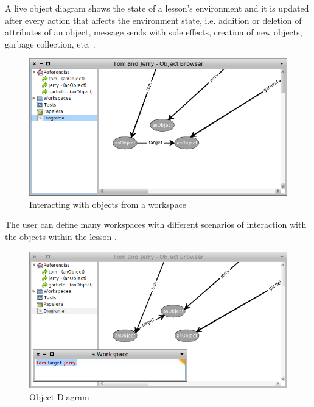 \documentclass{sigplanconf}
\begin{document}
A live object diagram shows the state of a lesson’s environment and it is updated after every action that affects the environment state, i.e. addition or deletion of attributes of an object, message sends with side effects, creation of new objects, garbage collection, etc. .
\begin{figure}[h]
 \centering
 \includegraphics[scale=.35]{./images/workspace.png}
 \caption{Interacting with objects from a workspace}
 \label{fig:workspace}
\end{figure}

The user can define many workspaces with different scenarios of interaction with the objects within the lesson . 
\begin{figure}[h]
 \centering
 \includegraphics[scale=.35]{./images/objectDiagram.png}
 \caption{Object Diagram}
 \label{fig:objectDiagram}
\end{figure}
\end{document}
